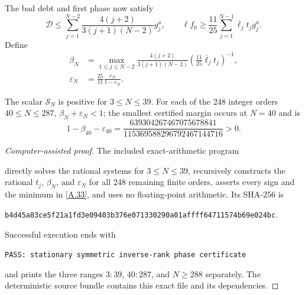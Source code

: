 The bad debt and first phase now satisfy
\[
 \mathcal D\le\sum_{j=1}^{N-2}
 {\frac{4(j+2)}{3(j+1)(N-2)}}g_j^a,\qquad
 \ell f_0\ge{\frac{11}{25}}\sum_{j=1}^{N-1}
 \overline\ell_jt_jg_j^a.                                \tag{A.31}\label{A.31}
\]
Define
\[
\begin{aligned}
 \beta_N&=\max_{1\le j\le N-2}
 {\frac{4(j+2)}{3(j+1)(N-2)}}
 \left({\frac{11}{25}}\overline\ell_jt_j\right)^{-1},\\
 \varepsilon_N&={\frac{25}{11}}{\frac{c_N}{1-c_N}}.
\end{aligned}                                              \tag{A.32}\label{A.32}
\]
\begin{lemma}
\label{lem:symmetric-finite}
The scalar $\mathcal S_N$ is positive for $3\le N\le39$.  For each of the
248 integer orders $40\le N\le287$,
$\beta_N+\varepsilon_N<1$; the smallest certified margin occurs at $N=40$
and is
\[
1-\beta_{40}-\varepsilon_{40}
={\frac{639304267467075678841}{115369588296792467144716}}>0.  \tag{A.33}\label{A.33}
\]
\end{lemma}

\begin{proof}[Computer-assisted proof]
The included exact-arithmetic program
\begin{center}
\small{}
\end{center}
directly solves the rational systems for $3\le N\le39$, recursively constructs the rational
$t_j$, $\beta_N$, and $\varepsilon_N$ for all 248 remaining finite orders,
asserts every sign and the minimum in \eqref{A.33}, and uses no floating-point
arithmetic.  Its SHA-256 is
\begin{center}
\small\nolinkurl{b4d45a83ce5f21a1fd3e09403b376e071330290a01affff64711574b69e024bc}.
\end{center}
Successful execution ends with
\begin{center}
\small\texttt{PASS: stationary symmetric inverse-rank phase certificate}
\end{center}
and prints
the three ranges $3\!:\!39$, $40\!:\!287$, and $N\ge288$ separately.  The
deterministic source bundle contains this exact file and its dependencies.
\end{proof}

